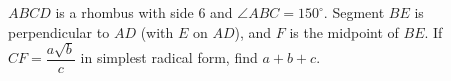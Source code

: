 $ABCD$ is a rhombus with side $6$ and $\angle ABC=150^\circ$. Segment $BE$ is perpendicular to $AD$ (with $E$ on $AD$), and $F$ is the midpoint of $BE$. If $CF=\dfrac{a\sqrt b}c$ in simplest radical form, find $a+b+c$.
